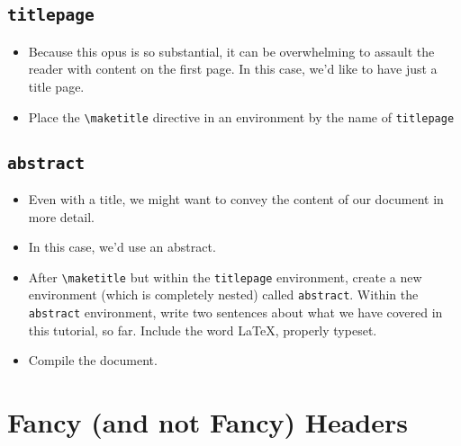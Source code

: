 \subsection*{\texttt{titlepage}}
\begin{itemize}
\item Because this opus is so substantial, it can be overwhelming to
  assault the reader with content on the first page. In this case,
  we'd like to have just a title page.
\item Place the \texttt{\textbackslash maketitle} directive in an
  environment by the name of \texttt{titlepage}
\end{itemize}

\subsection*{\texttt{abstract}}
\begin{itemize}
\item Even with a title, we might want to convey the content of our
  document in more detail.
\item In this case, we'd use an abstract.
\item After \texttt{\textbackslash maketitle} but within the
  \texttt{titlepage} environment, create a new environment (which is
  completely nested) called \texttt{abstract}. Within the
  \texttt{abstract} environment, write two sentences about what we
  have covered in this tutorial, so far. Include the word \LaTeX,
  properly typeset.
\item Compile the document.
\end{itemize}

\section{Fancy (and not Fancy) Headers}

